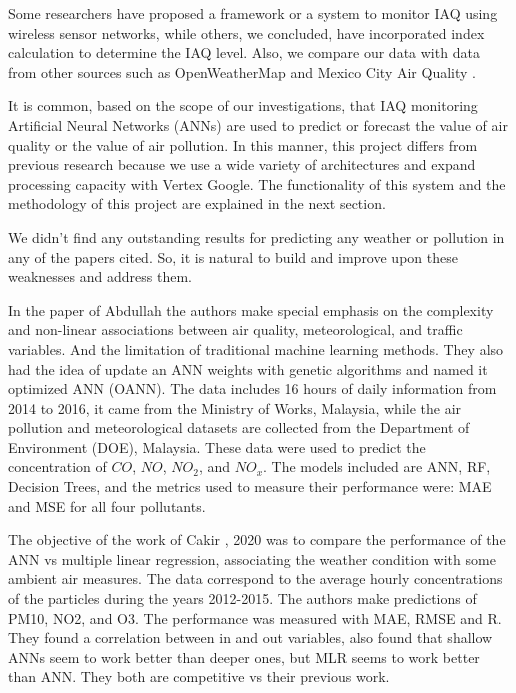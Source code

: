 \documentclass{llncs}
\begin{document}
Some researchers have proposed a framework or a system to monitor IAQ
using wireless sensor networks, while others, 
we concluded, have incorporated index calculation to determine the 
IAQ level. Also, we compare our data with data from other sources
such as OpenWeatherMap \cite{openweather} and Mexico City Air Quality
\cite{sinaica,sedema}.

It is common, based on the scope of our investigations, that IAQ
monitoring Artificial Neural Networks (ANNs) are used to predict 
or forecast the value of air quality 
or the value of air pollution. In this manner, this project differs from
previous research because we use a wide variety of architectures and
expand processing capacity with Vertex Google. The functionality of this
system and the methodology of this project are explained in the next
section.

We didn't find any outstanding results for predicting any weather or
pollution in any of the papers cited. So, it is natural to build and
improve upon these weaknesses and address them.

In the paper of Abdullah \cite{abdullah} the authors make special emphasis
on the complexity and non-linear associations between air quality,
meteorological, and traffic variables. And the limitation of traditional
machine learning methods. They also had the idea of update an ANN
weights with genetic algorithms and named it optimized ANN (OANN). The
data includes 16 hours of daily information from 2014 to 2016, it came
from the Ministry of Works, Malaysia, while the air pollution and
meteorological datasets are collected from the Department of Environment
(DOE), Malaysia. These data were used to predict the concentration of
$CO$, $NO$, $NO_{2}$, and $NO_{x}$. The models included are ANN, RF, Decision Trees,
and the metrics used to measure their performance were: MAE and MSE for
all four pollutants.

The objective of the work of Cakir \cite{cakir}, 2020 was to compare the
performance of the ANN vs multiple linear regression, associating the
weather condition with some ambient air measures. The data correspond to
the average hourly concentrations of the particles during the years
2012-2015. The authors make predictions of PM10, NO2, and O3. The
performance was measured with MAE, RMSE and R. They found a correlation
between in and out variables, also found that shallow ANNs seem to work
better than deeper ones, but MLR seems to work better than ANN. They
both are competitive vs their previous work.
\end{document}
